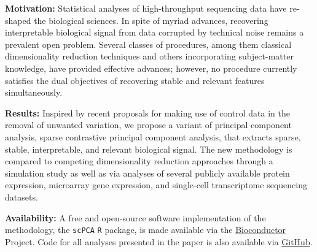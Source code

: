 \textbf{Motivation:} Statistical analyses of high-throughput sequencing data have re-shaped the biological sciences. In spite of myriad advances, recovering interpretable biological signal from data corrupted by technical noise remains a prevalent open problem. Several classes of procedures, among them classical dimensionality reduction techniques and others incorporating subject-matter knowledge, have provided effective advances; however, no procedure currently satisfies the dual objectives of recovering stable and relevant features simultaneously. 

\textbf{Results:} Inspired by recent proposals for making use of control data in the removal of unwanted variation, we propose a variant of principal component analysis, sparse contrastive principal component analysis, that extracts sparse, stable, interpretable, and relevant biological signal. The new methodology is compared to competing
dimensionality reduction approaches through a simulation study as well as via analyses of several publicly available protein expression, microarray gene expression, and single-cell transcriptome sequencing datasets.

\textbf{Availability:} A free and open-source software implementation of the methodology, the \texttt{scPCA} \texttt{R} package, is made available via the \href{https://bioconductor.org/packages/release/bioc/html/scPCA.html}{Bioconductor} Project. Code for all analyses presented in the paper is also available via \href{https://github.com/PhilBoileau/EHDBDscPCA}{GitHub}.